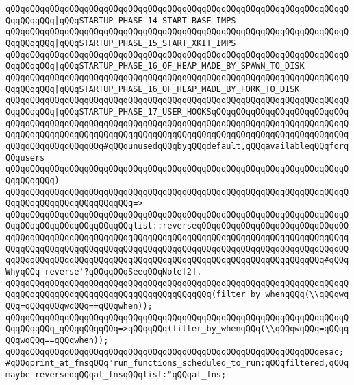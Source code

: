 \verb|qQQqqQQqqQQqqQQqqQQqqQQqqQQqqQQqqQQqqQQqqQQqqQQqqQQqqQQqqQQqqQQqqQQqqQQqqQQqqQQq|\verb#|qQQqSTARTUP_PHASE_14_START_BASE_IMPS#\newline
\verb|qQQqqQQqqQQqqQQqqQQqqQQqqQQqqQQqqQQqqQQqqQQqqQQqqQQqqQQqqQQqqQQqqQQqqQQqqQQqqQQq|\verb#|qQQqSTARTUP_PHASE_15_START_XKIT_IMPS#\newline
\verb|qQQqqQQqqQQqqQQqqQQqqQQqqQQqqQQqqQQqqQQqqQQqqQQqqQQqqQQqqQQqqQQqqQQqqQQqqQQqqQQq|\verb#|qQQqSTARTUP_PHASE_16_OF_HEAP_MADE_BY_SPAWN_TO_DISK#\newline
\verb|qQQqqQQqqQQqqQQqqQQqqQQqqQQqqQQqqQQqqQQqqQQqqQQqqQQqqQQqqQQqqQQqqQQqqQQqqQQqqQQq|\verb#|qQQqSTARTUP_PHASE_16_OF_HEAP_MADE_BY_FORK_TO_DISK#\newline
\verb|qQQqqQQqqQQqqQQqqQQqqQQqqQQqqQQqqQQqqQQqqQQqqQQqqQQqqQQqqQQqqQQqqQQqqQQqqQQqqQQq|\verb#|qQQqSTARTUP_PHASE_17_USER_HOOKSqQQqqQQqqQQqqQQqqQQqqQQqqQQqqQQqqQQqqQQqqQQqqQQqqQQqqQQqqQQqqQQqqQQqqQQqqQQqqQQqqQQqqQQqqQQqqQQqqQQqqQQqqQQqqQQqqQQqqQQqqQQqqQQqqQQqqQQqqQQqqQQqqQQqqQQqqQQqqQQqqQQqqQQqqQQqqQQqqQQqqQQqqQQq#\verb|#qQQqunusedqQQqbyqQQqdefault,qQQqavailableqQQqforqQQqusers|\newline
\verb|qQQqqQQqqQQqqQQqqQQqqQQqqQQqqQQqqQQqqQQqqQQqqQQqqQQqqQQqqQQqqQQqqQQqqQQqqQQqqQQq)|\newline
\verb|qQQqqQQqqQQqqQQqqQQqqQQqqQQqqQQqqQQqqQQqqQQqqQQqqQQqqQQqqQQqqQQqqQQqqQQqqQQqqQQqqQQqqQQqqQQqqQQq=>|\newline
\verb|qQQqqQQqqQQqqQQqqQQqqQQqqQQqqQQqqQQqqQQqqQQqqQQqqQQqqQQqqQQqqQQqqQQqqQQqqQQqqQQqqQQqqQQqqQQqqQQqlist::reverseqQQqqQQqqQQqqQQqqQQqqQQqqQQqqQQqqQQqqQQqqQQqqQQqqQQqqQQqqQQqqQQqqQQqqQQqqQQqqQQqqQQqqQQqqQQqqQQqqQQqqQQqqQQqqQQqqQQqqQQqqQQqqQQqqQQqqQQqqQQqqQQqqQQqqQQqqQQqqQQqqQQqqQQqqQQqqQQqqQQqqQQqqQQqqQQqqQQqqQQqqQQqqQQqqQQqqQQqqQQqqQQqqQQqqQQqqQQq#qQQqWhyqQQq'reverse'?qQQqqQQqSeeqQQqNote[2].|\newline
\verb|qQQqqQQqqQQqqQQqqQQqqQQqqQQqqQQqqQQqqQQqqQQqqQQqqQQqqQQqqQQqqQQqqQQqqQQqqQQqqQQqqQQqqQQqqQQqqQQqqQQqqQQqqQQqqQQq(filter_by_whenqQQq(\\qQQqwqQQq=qQQqqQQqwqQQq==qQQqwhen));|\newline
\verb|qQQqqQQqqQQqqQQqqQQqqQQqqQQqqQQqqQQqqQQqqQQqqQQqqQQqqQQqqQQqqQQqqQQqqQQqqQQqqQQq_qQQqqQQqqQQq=>qQQqqQQq(filter_by_whenqQQq(\\qQQqwqQQq=qQQqqQQqwqQQq==qQQqwhen));|\newline
\verb|qQQqqQQqqQQqqQQqqQQqqQQqqQQqqQQqqQQqqQQqqQQqqQQqqQQqqQQqqQQqqQQqesac;|\newline
\verb|#qQQqprint_at_fnsqQQq"run_functions_scheduled_to_run:qQQqfiltered,qQQqmaybe-reversedqQQqat_fnsqQQqlist:"qQQqat_fns;|\newline
